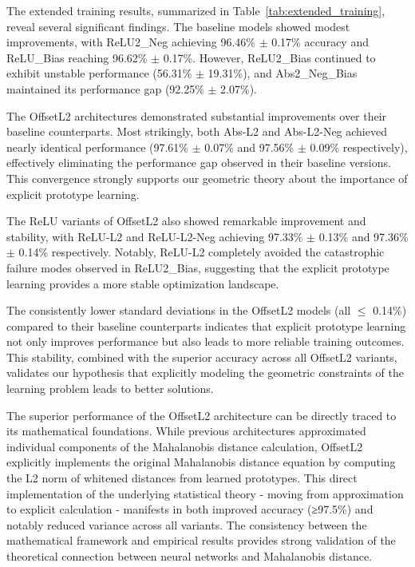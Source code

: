 The extended training results, summarized in Table~\ref{tab:extended_training}, reveal several significant findings. The baseline models showed modest improvements, with ReLU2\_Neg achieving 96.46\% $\pm$ 0.17\% accuracy and ReLU\_Bias reaching 96.62\% $\pm$ 0.17\%. However, ReLU2\_Bias continued to exhibit unstable performance (56.31\% $\pm$ 19.31\%), and Abs2\_Neg\_Bias maintained its performance gap (92.25\% $\pm$ 2.07\%).

The OffsetL2 architectures demonstrated substantial improvements over their baseline counterparts. Most strikingly, both Abs-L2 and Abs-L2-Neg achieved nearly identical performance (97.61\% $\pm$ 0.07\% and 97.56\% $\pm$ 0.09\% respectively), effectively eliminating the performance gap observed in their baseline versions. This convergence strongly supports our geometric theory about the importance of explicit prototype learning.

The ReLU variants of OffsetL2 also showed remarkable improvement and stability, with ReLU-L2 and ReLU-L2-Neg achieving 97.33\% $\pm$ 0.13\% and 97.36\% $\pm$ 0.14\% respectively. Notably, ReLU-L2 completely avoided the catastrophic failure modes observed in ReLU2\_Bias, suggesting that the explicit prototype learning provides a more stable optimization landscape.

The consistently lower standard deviations in the OffsetL2 models (all $\leq$ 0.14\%) compared to their baseline counterparts indicates that explicit prototype learning not only improves performance but also leads to more reliable training outcomes. This stability, combined with the superior accuracy across all OffsetL2 variants, validates our hypothesis that explicitly modeling the geometric constraints of the learning problem leads to better solutions.

The superior performance of the OffsetL2 architecture can be directly traced to its mathematical foundations. While previous architectures approximated individual components of the Mahalanobis distance calculation, OffsetL2 explicitly implements the original Mahalanobis distance equation by computing the L2 norm of whitened distances from learned prototypes. This direct implementation of the underlying statistical theory - moving from approximation to explicit calculation - manifests in both improved accuracy (≥97.5\%) and notably reduced variance across all variants. The consistency between the mathematical framework and empirical results provides strong validation of the theoretical connection between neural networks and Mahalanobis distance.

